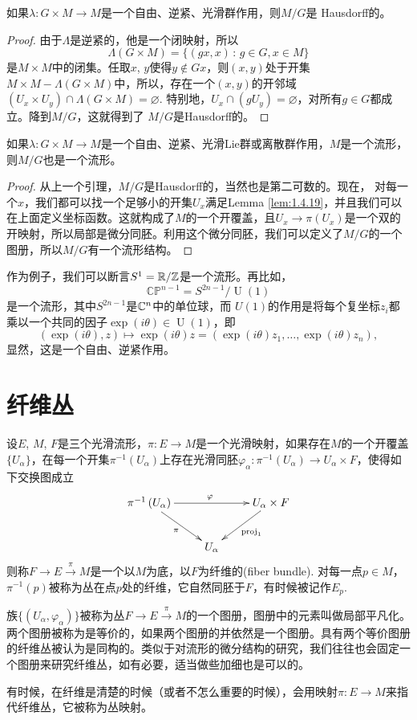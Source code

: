 \begin{lem}
	如果$\lambda:G\times M\to M$是一个自由、逆紧、光滑群作用，则$M/G$是
	Hausdorff的。
\end{lem}

\begin{proof}
	由于$\Lambda$是逆紧的，他是一个闭映射，所以
	\[
		\Lambda(G\times M)=\{(gx,x)\,:\,g\in G,x\in M\}
	\]
	是$M\times M$中的闭集。任取$x$, $y$使得$y\not\in Gx$，则$(x,y)$处于开集
	$M\times M-\Lambda(G\times M)$中，所以，存在一个$(x,y)$的开邻域$(U_x\times U_y)\cap \Lambda(G\times M)=\varnothing$. 特别地，$U_x\cap (gU_y)=\varnothing$，对所有$g\in G$都成立。降到$M/G$，这就得到了
	$M/G$是Hausdorff的。
\end{proof}

\begin{pro}
	如果$\lambda:G\times M\to M$是一个自由、逆紧、光滑Lie群或离散群作用，$M$是一个流形，则$M/G$也是一个流形。
\end{pro}

\begin{proof}
	从上一个引理，$M/G$是Hausdorff的，当然也是第二可数的。现在，
	对每一个$x$，我们都可以找一个足够小的开集$U_x$满足Lemma \ref{lem:1.4.19}，并且我们可以在上面定义坐标函数。这就构成了$M$的一个开覆盖，且$U_x\to \pi(U_x)$是一个双的开映射，所以局部是微分同胚。利用这个微分同胚，我们可以定义了$M/G$的一个图册，所以$M/G$有一个流形结构。
\end{proof}

作为例子，我们可以断言$S^1=\mathbb{R}/\mathbb{Z}$是一个流形。再比如，
\[
	\mathbb{CP}^{n-1}=S^{2n-1}/\operatorname{U}(1)
\]
是一个流形，其中$S^{2n-1}$是$\mathbb{C}^{n}$中的单位球，而
$U(1)$的作用是将每个复坐标$z_i$都乘以一个共同的因子$\exp(i\theta)\in \operatorname{U}(1)$，即
\[
	(\exp(i\theta),z)\mapsto \exp(i\theta)z=(\exp(i\theta)z_1,\dots,\exp(i\theta)z_n),
\]
显然，这是一个自由、逆紧作用。

\section{纤维丛}

\begin{para}[纤维丛]\label{bundle}
设$E$, $M$, $F$是三个光滑流形，$\pi:E\to M$是一个光滑映射，如果存在$M$的一个开覆盖$\{U_\alpha\}$，在每一个开集$\pi^{-1}(U_\alpha)$上存在光滑同胚$\varphi_\alpha: \pi^{-1}(U_\alpha)\to U_\alpha\times F$，使得如下交换图成立
\[
	\xymatrix{
		\pi^{-1}\left(U_\alpha\right)\ar[rr]^\varphi \ar[dr]_\pi&&U_\alpha\times F \ar[dl]^{\proj_1}\\
		&U_\alpha&
		}
\]
则称$F\to E\xrightarrow{\pi} M$是一个以$M$为底，以$F$为纤维的(fiber bundle). 对每一点$p\in M$，$\pi^{-1}(p)$被称为丛在点$p$处的纤维，它自然同胚于$F$，有时候被记作$E_p$. 

族$\{(U_\alpha,\varphi_\alpha)\}$被称为丛$F\to E\xrightarrow{\pi} M$的一个图册，图册中的元素叫做局部平凡化。两个图册被称为是等价的，如果两个图册的并依然是一个图册。具有两个等价图册的纤维丛被认为是同构的。类似于对流形的微分结构的研究，我们往往也会固定一个图册来研究纤维丛，如有必要，适当做些加细也是可以的。

有时候，在纤维是清楚的时候（或者不怎么重要的时候），会用映射$\pi:E\to M$来指代纤维丛，它被称为丛映射。
\end{para}

